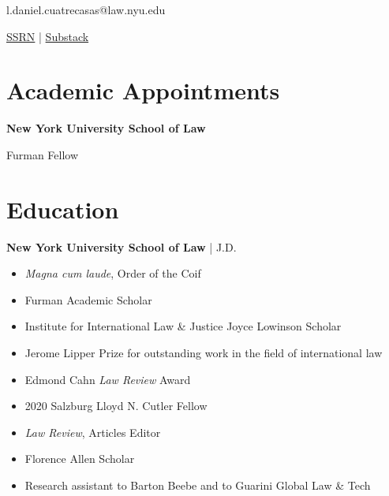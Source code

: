 \documentclass[10pt]{article}
\newcommand{\years}[1]{\marginnote{\scriptsize #1}}
\begin{document}
 \thispagestyle{firstpage}

 \hfill l.daniel.cuatrecasas@law.nyu.edu \par
\vspace{1pt}
\null \hfill \href{https://papers.ssrn.com/sol3/cf_dev/AbsByAuth.cfm?per_id=3987330}{SSRN} | \href{https://nycdna.substack.com/}{Substack}

\bigskip

\section*{Academic Appointments}

\years{2024—}
\textbf{New York University School of Law} \par Furman Fellow

\section*{Education}

\years{2021}
\textbf{New York University School of Law} | J.D.
\smallskip
\begin{itemize}
\item \textit{Magna cum laude}, Order of the Coif
\item Furman Academic Scholar
\item Institute for International Law \& Justice Joyce Lowinson Scholar
\item Jerome Lipper Prize for outstanding work in the field of international law
\item Edmond Cahn \textit{Law Review} Award
\item 2020 Salzburg Lloyd N. Cutler Fellow
\item \textit{Law Review}, Articles Editor
\item Florence Allen Scholar
\item Research assistant to Barton Beebe and to Guarini Global Law \& Tech
\end{itemize}
\bigskip
\end{document}
